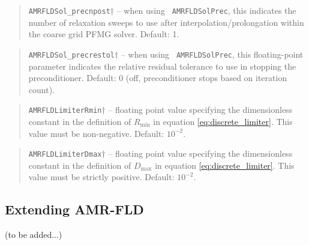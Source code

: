 \documentclass[10pt]{article}
\renewcommand{\(}{\left(}
\renewcommand{\)}{\right)}
\begin{document}
%
\blockquote{{\tt AMRFLDSol\_precnpost}$\dagger$ -- when using {\tt
    AMRFLDSolPrec}, this indicates the number of relaxation sweeps to
  use after interpolation/prolongation within the coarse grid PFMG
  solver.  Default: 1.}
%
\blockquote{{\tt AMRFLDSol\_precrestol}$\dagger$ -- when using {\tt
    AMRFLDSolPrec}, this floating-point parameter indicates the
  relative residual tolerance to use in stopping the preconditioner.
  Default: 0 (off, preconditioner stops based on iteration count).}
%
\blockquote{{\tt AMRFLDLimiterRmin}$\dagger$ -- floating point value
  specifying the dimensionless constant in the definition of
  $R_{\text{min}}$ in equation \eqref{eq:discrete_limiter}.  This
  value must be non-negative.  Default: $10^{-2}$.} 
%
\blockquote{{\tt AMRFLDLimiterDmax}$\dagger$ -- floating point value specifying the
  dimensionless constant in the definition of $D_{\text{max}}$ in
  equation \eqref{eq:discrete_limiter}.  This value must be strictly
  positive.  Default: $10^{-2}$.}








\subsection{Extending AMR-FLD}
\label{sec:extensions}

(to be added...)






\end{document}
